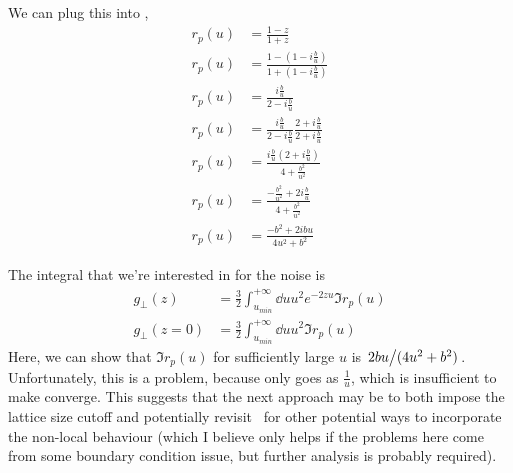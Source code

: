 \documentclass[../main.tex]{subfiles}
\begin{document}
	We can plug this into ,
	\begin{align}
		r_p(u) &= \frac{1 - z}{1 + z} \\
		r_p(u) &= \frac{1 - (1 - i \frac{b}{u})}{1 + (1 - i \frac{b}{u})} \\
		r_p(u) &= \frac{i \frac{b}{u}}{2 - i \frac{b}{u}} \\
		r_p(u) &= \frac{i \frac{b}{u}}{2 - i \frac{b}{u}} \frac{2 + i \frac{b}{u}}{2 + i \frac{b}{u}} \\
		r_p(u) &= \frac{i \frac{b}{u}(2 + i \frac{b}{u})}{4 + \frac{b^2}{u^2}} \\
		r_p(u) &= \frac{- \frac{b^2}{u^2} + 2i \frac{b}{u}}{4 + \frac{b^2}{u^2}} \\
		r_p(u) &= \frac{- b^2 + 2i b u}{4 u^2+ b^2} \label{eq:imrp}
	\end{align}

	The integral that we're interested in for the noise is
	\begin{align}
		g_\perp(z) &= \frac32 \int_{u_{min}}^{+\infty} \dd{u} u^2 e^{-2 z u} \Im r_p(u) \\
		g_\perp(z = 0) &= \frac32 \int_{u_{min}}^{+\infty} \dd{u} u^2 \Im r_p(u) \label{eq:asymptotic:gperpsimplest}
	\end{align}
	Here, we can show that $\Im r_p(u)$ for sufficiently large $u$ is $\flatfrac{2 b u}{(4u^2 + b^2)}$.
	Unfortunately, this is a problem, because  only goes as $\frac{1}{u}$, which is insufficient to make  converge.
	This suggests that the next approach may be to both impose the lattice size cutoff and potentially revisit~\cite{Churchill2016} for other potential ways to incorporate the non-local behaviour (which I believe only helps if the problems here come from some boundary condition issue, but further analysis is probably required).
\end{document}

